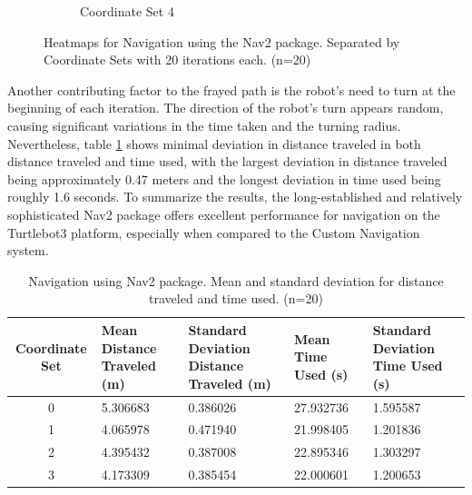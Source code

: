 \documentclass[%
paper=A4,               %
twoside=true,           %
openright,              %
11pt,                   %
bibliography=totoc,     %
titlepage=on,           %
DIV=12,                 %
BCOR=1.5cm,             %
parskip=half,            %
final
]{scrreprt}
\begin{document}
\begin{figure}[H]
\begin{subfigure}[b]{0.45\textwidth}
			\caption{Coordinate Set 4}
			\label{fig:fig13}
		\end{subfigure}
		\caption{Heatmaps for Navigation using the Nav2 package. Separated by Coordinate Sets with 20 iterations each. (n=20)}
		\label{fig:heatmaps}
	\end{figure}
	
	Another contributing factor to the frayed path is the robot's need to turn at the beginning of each iteration. The direction of the robot's turn appears random, causing significant variations in the time taken and the turning radius. Nevertheless, table \ref{tab:1} shows minimal deviation in distance traveled in both distance traveled and time used, with the largest deviation in distance traveled being approximately 0.47 meters and the longest deviation in time used being roughly 1.6 seconds. \newline
	To summarize the results, the long-established and relatively sophisticated Nav2 package offers excellent performance for navigation on the Turtlebot3 platform, especially when compared to the Custom Navigation system.

	
	
	\begin{table}[H]
		\centering
		\small %
		\begin{tabular}{|c|p{3cm}|p{3cm}|p{3cm}|p{3cm}|}
			\hline
			Coordinate Set & Mean Distance \newline Traveled (m) & Standard Deviation \newline Distance  Traveled (m) & Mean Time \newline Used (s) & Standard Deviation \newline Time Used (s) \\
			\hline
			0 & 5.306683 & 0.386026 & 27.932736 & 1.595587 \\
			1 & 4.065978 & 0.471940 & 21.998405 & 1.201836 \\
			2 & 4.395432 & 0.387008 & 22.895346 & 1.303297 \\
			3 & 4.173309 & 0.385454 & 22.000601 & 1.200653 \\
			\hline
		\end{tabular}
		\caption{Navigation using Nav2 package. Mean and standard deviation for distance traveled and time used.  (n=20)}
		\label{tab:1}
	\end{table}

	
	
	\clearpage
\end{document}
